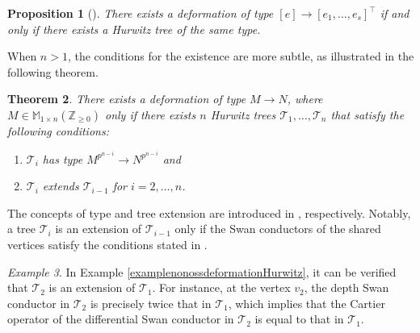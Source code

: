\documentclass{compositio}
\newtheorem{theorem}{Theorem}[section]
\newtheorem{proposition}[theorem]{Proposition}
\theoremstyle{remark}
\newtheorem{example}[theorem]{Example}
\theoremstyle{remark}
\begin{document}
\begin{proposition}[{\cite{2020arXiv200203719D}}]
There exists a deformation of type $[e] \rightarrow [e_1, \ldots, e_s]^{\top}$ if and only if there exists a Hurwitz tree of the same type.
\end{proposition}

When $n>1$, the conditions for the existence are more subtle, as illustrated in the following theorem.



\begin{theorem}
    There exists a deformation of type $M \xrightarrow{} N$, where $M \in \mathbb{M}_{1 \times n}(\mathbb{Z}_{\ge 0})$ only if there exists $n$ Hurwitz trees $\mathcal{T}_1, \ldots, \mathcal{T}_n$ that satisfy the following conditions:
    \begin{enumerate}
        \item $\mathcal{T}_i$ has type $M^{p^{n-i}} \xrightarrow{} N^{p^{n-i}}$ and
        \item $\mathcal{T}_i$ extends $\mathcal{T}_{i-1}$ for $i=2, \ldots, n$.
    \end{enumerate}
\end{theorem}

The concepts of type and tree extension are introduced in \cite[Definition 4.2 and Definition 4.6]{2020arXiv201013614D}, respectively. Notably, a tree $\mathcal{T}_i$ is an extension of $\mathcal{T}_{i-1}$ only if the Swan conductors of the shared vertices satisfy the conditions stated in \cite[Theorem 3.4.2]{2020arXiv201013614D}.




\begin{example}
In Example \ref{examplenonossdeformationHurwitz}, it can be verified that $\mathcal{T}_2$ is an extension of $\mathcal{T}_1$. For instance, at the vertex $v_2$, the depth Swan conductor in $\mathcal{T}_2$ is precisely twice that in $\mathcal{T}_1$, which implies that the Cartier operator of the differential Swan conductor in $\mathcal{T}_2$ is equal to that in $\mathcal{T}_1$.
\end{example}
\end{document}
